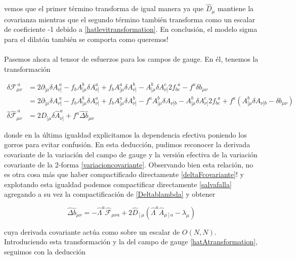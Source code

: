 \documentclass{article}
\numberwithin{equation}{section}
\begin{document}
vemos que el primer término transforma de igual manera ya que $\hat{D}_{\mu}$
mantiene la covarianza mientras que el segundo término también transforma
como un escalar de coeficiente -1 debido a \ref{hatlevitransformation}.
En conclusión, el modelo sigma para el dilatón también se comporta
como queremos!\\
\\
Pasemos ahora al tensor de esfuerzos para los campos de gauge. En
él, tenemos la transformación

\begin{align*}
\delta\mathcal{F}_{\mu\nu}^{\ a} & =2\partial_{[\mu}\delta A_{\nu]}^{\ a}-f_{b}A_{[\mu}^{b}\delta A_{\nu]}^{a}+f_{b}A_{[\mu}^{a}\delta A_{\nu]}^{b}-A_{[\mu}^{b}\delta A_{\nu]}^{c}2f_{bc}^{\ \ a}-f^{a}\delta b_{\mu\nu}\\
& =2\partial_{[\mu}\delta A_{\nu]}^{\ a}-f_{b}A_{[\mu}^{b}\delta A_{\nu]}^{a}+f_{b}A_{[\mu}^{a}\delta A_{\nu]}^{b}-f^{a}A_{[\mu}^{b}\delta A_{\nu]b}-A_{[\mu}^{b}\delta A_{\nu]}^{c}2f_{bc}^{\ \ a}+f^{a}\left(A_{[\mu}^{b}\delta A_{\nu]b}-\delta b_{\mu\nu}\right)\\
\hat{\delta}\hat{\mathcal{F}}_{\mu\nu}^{\ a}& =2D_{[\mu}\hat{\delta} \hat{A}_{\nu]}^{a}+f^{a}\hat{\Delta} \hat{b}_{\mu\nu}
\end{align*}


donde en la última igualdad explicitamos la dependencia efectiva poniendo los gorros para evitar confusión. En esta deducción, pudimos reconocer la derivada covariante de la variación del
campo de gauge y la versión efectiva de la variación covariante de
la 2-forma \ref{variacioncovariante}. Observando bien esta relación, no es otra cosa más que
haber compactificado directamente \ref{deltaFcovariante}! y explotando esta igualdad podemos compactificar directamente \ref{salvafalla} agregando a su vez la compactificación de \ref{Deltablambda} y obtener

\begin{equation}
\hat{\Delta} \hat{b}_{\mu\nu} = -\hat{\Lambda}^a \hat{\mathcal{F}}_{\mu \nu a} +  2\hat{D}_{\left[\mu\right.}\left(\hat{\Lambda}^a\hat{A}_{\left.\mu \right]a} - \lambda_{\mu}\right)
\end{equation}	

cuya derivada covariante actúa como sobre un escalar de $ O(N,N) $. Introduciendo esta transformación y la del campo de gauge \ref{hatAtransformation}, seguimos con la deducción
\end{document}
